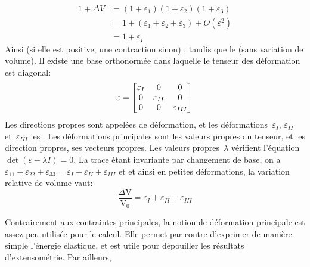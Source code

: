 \begin{equation}\begin{aligned}
	1 + \Delta V &= (1+\varepsilon_1) (1+\varepsilon_2) (1+\varepsilon_3)\\
		& = 1+( \varepsilon_1+\varepsilon_2+\varepsilon_3)+O(\varepsilon^2) \\
		&= 1+\varepsilon_I
\end{aligned}\end{equation}
Ainsi  (si elle est positive, une contraction sinon) , tandis que le  (sans variation de volume).
\medskipvm
Il existe une base orthonormée dans laquelle le tenseur des déformation est diagonal:
\begin{equation} \varepsilon = \MM*{\varepsilon_I &0&0\\ 0&\varepsilon_{II}&0\\ 0&0&\varepsilon_{III}} \end{equation}
Les directions propres sont appelées  de déformation, et les déformations~$\varepsilon_I$, $\varepsilon_{II}$ et~$\varepsilon_{III}$ les .
\medskipvm
Les déformations principales sont les valeurs propres du tenseur, et les direction propres, ses vecteurs propres. Les valeurs propres~$\lambda$ vérifient l'équation~$\det(\varepsilon - \lambda I) = 0$.
\medskipvm
{} La trace étant invariante par changement de base, on a~$\varepsilon_{11}+\varepsilon_{22}+\varepsilon_{33} =\varepsilon_{I}+\varepsilon_{II}+\varepsilon_{III}$ et et ainsi en petites déformations, la variation relative de volume vaut:
\begin{equation}
  \frac{\Delta \mathrm{V}}{\mathrm{V}_0} = \varepsilon_{I} + \varepsilon_{II} + \varepsilon_{III}
\end{equation}

Contrairement aux contraintes principales, la notion de déformation principale est assez peu utilisée pour le calcul. Elle permet par contre d'exprimer de manière simple l'énergie élastique, et est utile pour dépouiller les résultats d'extensométrie.
Par ailleurs, 


